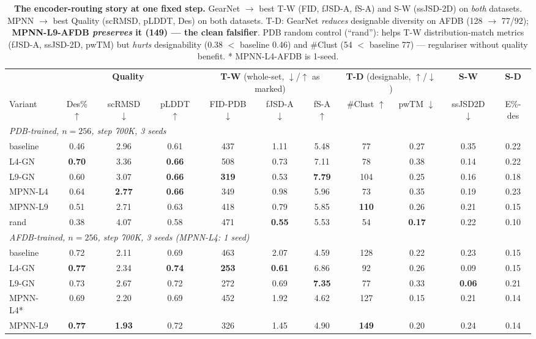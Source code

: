 \documentclass[11pt,a4paper]{article}
\begin{document}
\begin{table}[h]
\centering
\small
\setlength{\tabcolsep}{4pt}
\begin{tabular}{l|ccc|ccc|cc|c|c}
\toprule
& \multicolumn{3}{c|}{\textbf{Quality}}
& \multicolumn{3}{c|}{\textbf{T-W} (whole-set, $\downarrow$/$\uparrow$ as marked)}
& \multicolumn{2}{c|}{\textbf{T-D} (designable, $\uparrow$/$\downarrow$)}
& \textbf{S-W}
& \textbf{S-D} \\
Variant
& Des\% $\uparrow$ & scRMSD $\downarrow$ & pLDDT $\uparrow$
& FID-PDB $\downarrow$ & fJSD-A $\downarrow$ & fS-A $\uparrow$
& \#Clust $\uparrow$ & pwTM $\downarrow$
& ssJSD2D $\downarrow$
& E\%-des \\
\midrule
\multicolumn{11}{l}{\textit{PDB-trained, $n{=}256$, step 700K, 3 seeds}}\\
baseline       & 0.46 & 2.96 & 0.61 & 437 & 1.11 & 5.48 & 77 & 0.27 & 0.35 & 0.22 \\
L4-GN          & \textbf{0.70} & 3.36 & \textbf{0.66} & 508 & 0.73 & 7.11 & 78 & 0.38 & 0.14 & 0.22 \\
L9-GN          & 0.60 & 3.07 & \textbf{0.66} & \textbf{319} & 0.53 & \textbf{7.79} & 104 & 0.25 & 0.16 & 0.18 \\
MPNN-L4        & 0.64 & \textbf{2.77} & \textbf{0.66} & 349 & 0.98 & 5.96 & 73 & 0.35 & 0.19 & 0.23 \\
MPNN-L9        & 0.51 & 2.71 & 0.63 & 418 & 0.79 & 5.85 & \textbf{110} & 0.26 & 0.21 & 0.15 \\
rand           & 0.38 & 4.07 & 0.58 & 471 & \textbf{0.55} & 5.53 & 54 & \textbf{0.17} & 0.22 & 0.10 \\
\midrule
\multicolumn{11}{l}{\textit{AFDB-trained, $n{=}256$, step 700K, 3 seeds (MPNN-L4: 1 seed)}}\\
baseline       & 0.72 & 2.11 & 0.69 & 463 & 2.07 & 4.59 & 128 & 0.22 & 0.23 & 0.15 \\
L4-GN          & \textbf{0.77} & 2.34 & \textbf{0.74} & \textbf{253} & \textbf{0.61} & 6.86 & 92 & 0.26 & 0.09 & 0.15 \\
L9-GN          & 0.73 & 2.67 & 0.72 & 272 & 0.69 & \textbf{7.35} & 77 & 0.33 & \textbf{0.06} & 0.21 \\
MPNN-L4*       & 0.69 & 2.20 & 0.69 & 452 & 1.92 & 4.62 & 127 & 0.15 & 0.21 & 0.14 \\
MPNN-L9        & \textbf{0.77} & \textbf{1.93} & 0.72 & 326 & 1.45 & 4.90 & \textbf{149} & 0.20 & 0.24 & 0.14 \\
\bottomrule
\end{tabular}
\caption{\textbf{The encoder-routing story at one fixed step.}
GearNet $\to$ best T-W (FID, fJSD-A, fS-A) and S-W (ssJSD-2D) on
\emph{both} datasets. MPNN $\to$ best Quality (scRMSD, pLDDT, Des) on
both datasets. T-D: GearNet \emph{reduces} designable diversity on
AFDB (128 $\to$ 77/92); \textbf{MPNN-L9-AFDB \emph{preserves} it (149)
--- the clean falsifier}. PDB random control (``rand''): helps T-W
distribution-match metrics (fJSD-A, ssJSD-2D, pwTM) but \emph{hurts}
designability (0.38 $<$ baseline 0.46) and \#Clust (54 $<$ baseline 77)
--- regulariser without quality benefit. * MPNN-L4-AFDB is 1-seed.}
\end{table}
\end{document}
